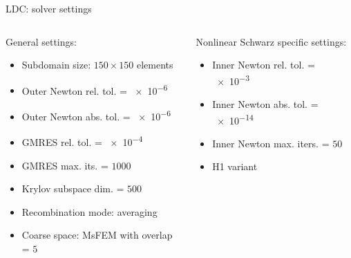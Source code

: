 \begin{frame}[noframenumbering]{LDC: solver settings}
	\begin{columns}
		\begin{column}{0.55\textwidth}
			General settings:
			\vspace{7pt}
			\begin{itemize}
				\item Subdomain size: $150\times 150$ elements
				\item Outer Newton rel. tol.  = \num{e-6}
				\item Outer Newton abs. tol.  = \num{e-6}
				\item GMRES rel. tol. = \num{e-4}
				\item GMRES max. its. = $1000$
				\item Krylov subspace dim. = $500$
				\item Recombination mode: averaging
				\item Coarse space: MsFEM with overlap = $5$
			\end{itemize}
		\end{column}%
		\begin{column}{0.45\textwidth}
			Nonlinear Schwarz specific settings:
			\vspace{7pt}
			\begin{itemize}
				\item Inner Newton rel. tol. = \num{e-3}
				\item Inner Newton abs. tol. = \num{e-14}
				\item Inner Newton max. iters. = $50$
				\item H1 variant
			\end{itemize}
		\end{column}
	\end{columns}
\end{frame}



